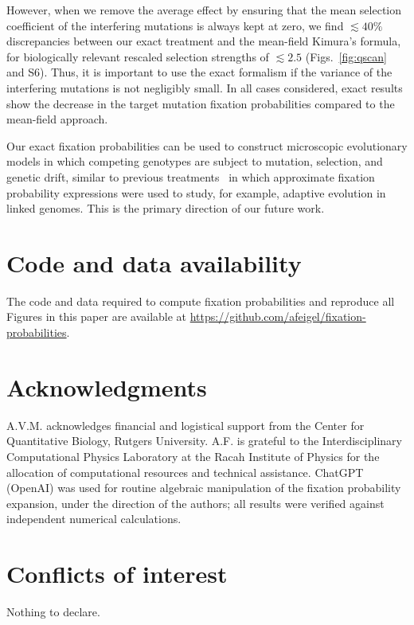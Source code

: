 \documentclass[9pt,twocolumn,twoside]{gsajnl}
\begin{document}
However, when we remove the average effect
by ensuring that the mean selection coefficient of the interfering mutations is always kept at zero, we find $\lesssim 40\%$ discrepancies between our exact treatment and the mean-field Kimura's formula,
for biologically relevant rescaled selection strengths of $\lesssim 2.5$ (Figs.~\ref{fig:qscan} and S6). %
Thus, it is important to use the exact formalism if the variance of the interfering mutations is not negligibly small.
In all cases considered, exact results show the decrease in the target mutation fixation probabilities compared to the mean-field approach.

Our exact fixation probabilities can be used to construct microscopic evolutionary models in which competing genotypes are subject to mutation, selection, and genetic drift, similar to
previous treatments~\citep{Gerrish1998,Park2010,Schiffels2011} in which approximate fixation probability expressions were used to study, for example, adaptive evolution in linked genomes.
This is the primary direction of our future work.


\section*{Code and data availability}
The code and data required to compute fixation probabilities and reproduce all Figures in this paper are available at \url{https://github.com/afeigel/fixation-probabilities}.

\section*{Acknowledgments}
A.V.M. acknowledges financial and logistical support from the Center for Quantitative Biology, Rutgers University.
A.F. is grateful to the Interdisciplinary Computational Physics Laboratory at the Racah Institute of Physics for the allocation of computational resources and technical assistance.
ChatGPT (OpenAI) was used for routine algebraic manipulation of the fixation probability expansion, under the direction of the authors; all results were verified against independent numerical calculations.

\section*{Conflicts of interest}
Nothing to declare.
\end{document}
